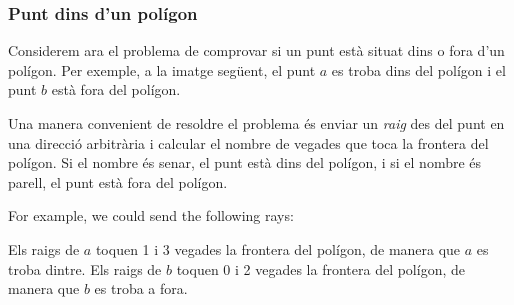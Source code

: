 \subsubsection{Punt dins d'un polígon}

Considerem ara el problema de comprovar si un punt està situat dins o fora d'un polígon. Per exemple, a la imatge següent, el punt $a$ es troba dins del polígon i el punt $b$ està fora del polígon.


\begin{center}
\end{center}


Una manera convenient de resoldre el problema és enviar un \emph{raig}
des del punt en una direcció arbitrària i calcular el nombre de
vegades que toca la frontera del polígon. Si el nombre és senar, el
punt està dins del polígon, i si el nombre és parell, el punt està
fora del polígon.


\begin{samepage}
For example, we could send the following rays:
\begin{center}
\end{center}
\end{samepage}


Els raigs de $a$ toquen 1 i 3 vegades la frontera del polígon, de
manera que $a$ es troba dintre. Els raigs de $b$ toquen 0 i 2 vegades
la frontera del polígon, de manera que $b$ es troba a fora.

